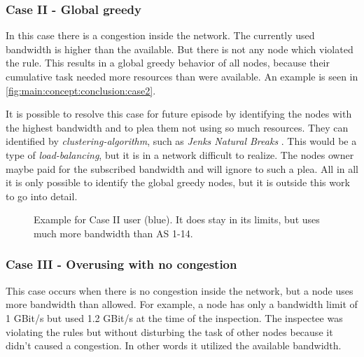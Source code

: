 \documentclass[thesis.tex]{subfiles}
\begin{document}
\subsubsection{Case II - Global greedy}
In this case there is a congestion inside the network. The currently used bandwidth is higher than the available. But there is not any node which violated the rule. This results in a global greedy behavior of all nodes, because their cumulative task needed more resources than were available. An example is seen in \autoref{fig:main:concept:conclusion:case2}.

It is possible to resolve this case for future episode by identifying the nodes with the highest bandwidth and to plea them not using so much resources. They can identified by \textit{clustering-algorithm}, such as \textit{Jenks Natural Breaks} \cite{Frenzel.1967}. This would be a type of \textit{load-balancing}, but it is in a network difficult to realize. The nodes owner maybe paid for the subscribed bandwidth and will ignore to such a plea. All in all it is only possible to identify the global greedy nodes, but it is outside this work to go into detail.

\begin{figure}
	\centering
	\caption{Example for Case II user (blue). It does stay in its limits, but uses much more bandwidth than AS 1-14.}
	\label{fig:main:concept:conclusion:case2}
\end{figure}

\subsubsection{Case III - Overusing with no congestion}
This case occurs when there is no congestion inside the network, but a node uses more bandwidth than allowed. For example, a node has only a bandwidth limit of 1 GBit/s but used 1.2 GBit/s at the time of the inspection. The inspectee was violating the rules but without disturbing the task of other nodes because it didn't caused a congestion. In other words it utilized the available bandwidth.
\end{document}
